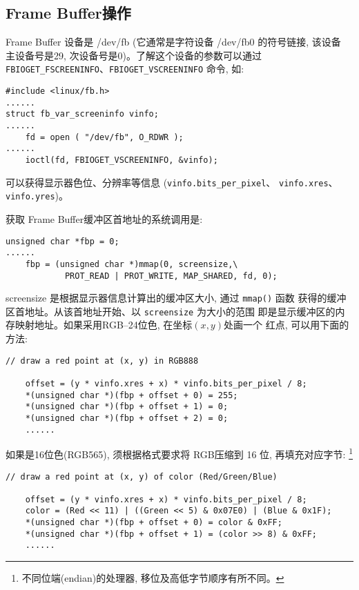 \subsection{Frame Buffer操作}
Frame Buffer 设备是 /dev/fb (它通常是字符设备 /dev/fb0 的符号链接, 该设备
主设备号是29, 次设备号是0)。了解这个设备的参数可以通过
\verb|FBIOGET_FSCREENINFO|、\verb|FBIOGET_VSCREENINFO| 命令, 如:
\newpage
\begin{lstlisting}
#include <linux/fb.h>
......
struct fb_var_screeninfo vinfo;
......
    fd = open ( "/dev/fb", O_RDWR );
......
    ioctl(fd, FBIOGET_VSCREENINFO, &vinfo);
\end{lstlisting}
可以获得显示器色位、分辨率等信息 (\verb|vinfo.bits_per_pixel|、
\verb|vinfo.xres|、\verb|vinfo.yres|)。

获取 Frame Buffer缓冲区首地址的系统调用是:

\begin{lstlisting}
unsigned char *fbp = 0;
......
    fbp = (unsigned char *)mmap(0, screensize,\
            PROT_READ | PROT_WRITE, MAP_SHARED, fd, 0);
\end{lstlisting}

screensize 是根据显示器信息计算出的缓冲区大小, 通过 \verb|mmap()| 函数
获得的缓冲区首地址。从该首地址开始、以 \verb|screensize| 为大小的范围
即是显示缓冲区的内存映射地址。如果采用RGB--24位色, 在坐标$(x, y)$处画一个
红点, 可以用下面的方法:

\begin{lstlisting}
// draw a red point at (x, y) in RGB888

    offset = (y * vinfo.xres + x) * vinfo.bits_per_pixel / 8;
    *(unsigned char *)(fbp + offset + 0) = 255;
    *(unsigned char *)(fbp + offset + 1) = 0;
    *(unsigned char *)(fbp + offset + 2) = 0;
    ......
\end{lstlisting}

如果是16位色(RGB565), 须根据格式要求将 RGB压缩到 16 位, 再填充对应字节:
\footnote{不同位端(endian)的处理器, 移位及高低字节顺序有所不同。}

\begin{lstlisting}
// draw a red point at (x, y) of color (Red/Green/Blue)

    offset = (y * vinfo.xres + x) * vinfo.bits_per_pixel / 8;
    color = (Red << 11) | ((Green << 5) & 0x07E0) | (Blue & 0x1F);
    *(unsigned char *)(fbp + offset + 0) = color & 0xFF;
    *(unsigned char *)(fbp + offset + 1) = (color >> 8) & 0xFF;
    ......
\end{lstlisting}

